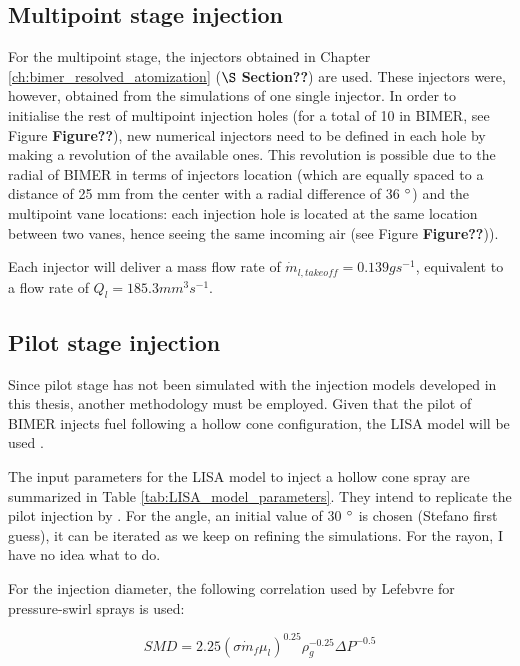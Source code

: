 \subsection{Multipoint stage injection}

For the multipoint stage, the injectors obtained in Chapter \ref{ch:bimer_resolved_atomization} ($\S$ \textbf{Section??}) are used. These injectors were, however, obtained from the simulations of one single injector. In order to initialise the rest of multipoint injection holes (for a total of 10 in BIMER, see Figure \textbf{Figure??}), new numerical injectors need to be defined in each hole by making a revolution of the available ones. This revolution is possible due to the radial of BIMER in terms of injectors location (which are equally spaced to a distance of 25 mm from the center with a radial difference of 36 $\degree$) and the multipoint vane locations: each injection hole is located at the same location between two vanes, hence seeing the same incoming air (see Figure \textbf{Figure??})).

Each injector will deliver a mass flow rate of $\dot{m}_{l,takeoff} = 0.139 g s^{-1}$, equivalent to a flow rate of $Q_l = 185.3 mm^3 s^{-1}$.


\subsection{Pilot stage injection}

Since pilot stage has not been simulated with the injection models developed in this thesis, another methodology must be employed. Given that the pilot of BIMER injects fuel following a hollow cone configuration, the LISA model will be used . 

The input parameters for the LISA model to inject a hollow cone spray are summarized in Table \ref{tab:LISA_model_parameters}. They intend to replicate the pilot injection by . For the angle, an initial value of 30 $\degree$ is chosen (Stefano first guess), it can be iterated as we keep on refining the simulations. For the rayon, I have no idea what to do.

For the injection diameter, the following correlation used by Lefebvre for pressure-swirl sprays is used:

\begin{equation}
SMD = 2.25 \left( \sigma \dot{m}_f \mu_l \right)^{0.25} \rho_g^{-0.25}  \Delta P^{-0.5}
\end{equation}

